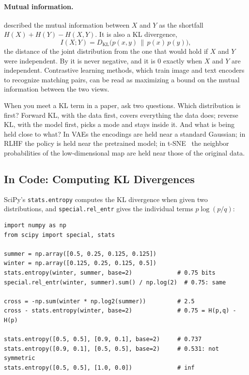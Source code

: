 \paragraph{Mutual information.}
 described the mutual information between
$X$ and $Y$ as the shortfall $H(X) + H(Y) - H(X, Y)$. It is also a KL
divergence,
\[
  I(X; Y) = D_{\mathrm{KL}}\bigl(p(x, y) \,\|\, p(x)\,p(y)\bigr),
\]
the distance of the joint distribution from the one that would hold if
$X$ and $Y$ were independent. By  it is never
negative, and it is $0$ exactly when $X$ and $Y$ are independent.
Contrastive learning methods, which train image and text encoders to
recognize matching pairs, can be read as maximizing a bound on the mutual
information between the two views.

\begin{aibox}
  When you meet a KL term in a paper, ask two questions. Which
  distribution is first? Forward KL, with the data first, covers
  everything the data does; reverse KL, with the model first, picks a
  mode and stays inside it. And what is being held close to what? In VAEs
  the encodings are held near a standard Gaussian; in RLHF the policy is
  held near the pretrained model; in t-SNE~\cite{vandermaaten2008tsne}
  the neighbor probabilities of the low-dimensional map are held near
  those of the original data.
\end{aibox}

\subsection{In Code: Computing KL Divergences}
\label{sec:ch07-kl-code}

SciPy's \texttt{stats.entropy} computes the KL divergence when given two
distributions, and \texttt{special.rel\_entr} gives the individual terms
$p \log(p/q)$:

\begin{lstlisting}
import numpy as np
from scipy import special, stats

summer = np.array([0.5, 0.25, 0.125, 0.125])
winter = np.array([0.125, 0.25, 0.125, 0.5])
stats.entropy(winter, summer, base=2)             # 0.75 bits
special.rel_entr(winter, summer).sum() / np.log(2)  # 0.75: same

cross = -np.sum(winter * np.log2(summer))         # 2.5
cross - stats.entropy(winter, base=2)             # 0.75 = H(p,q) - H(p)

stats.entropy([0.5, 0.5], [0.9, 0.1], base=2)     # 0.737
stats.entropy([0.9, 0.1], [0.5, 0.5], base=2)     # 0.531: not symmetric
stats.entropy([0.5, 0.5], [1.0, 0.0])             # inf
\end{lstlisting}

